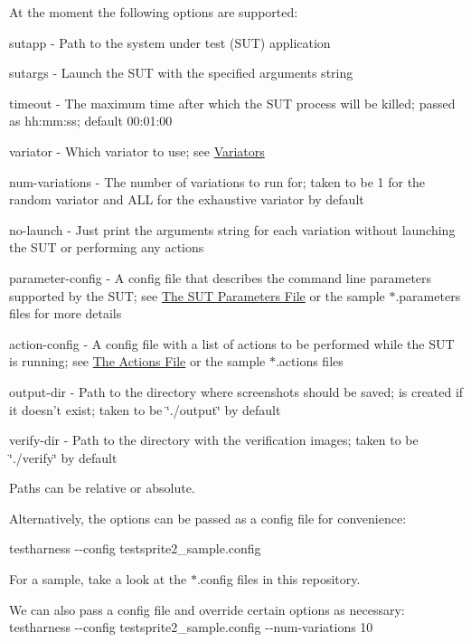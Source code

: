 At the moment the following options are supported\-: \begin{DoxyItemize}
\item {\ttfamily sutapp} -\/ Path to the system under test (S\-U\-T) application \item {\ttfamily sutargs} -\/ Launch the S\-U\-T with the specified arguments string \item {\ttfamily timeout} -\/ The maximum time after which the S\-U\-T process will be killed; passed as hh\-:mm\-:ss; default 00\-:01\-:00 \item {\ttfamily variator} -\/ Which variator to use; see \hyperlink{index_variators_sec}{Variators} \item {\ttfamily num-\/variations} -\/ The number of variations to run for; taken to be 1 for the random variator and A\-L\-L for the exhaustive variator by default \item {\ttfamily no-\/launch} -\/ Just print the arguments string for each variation without launching the S\-U\-T or performing any actions \item {\ttfamily parameter-\/config} -\/ A config file that describes the command line parameters supported by the S\-U\-T; see \hyperlink{index_paramconfig_sec}{The S\-U\-T Parameters File} or the sample $\ast$.parameters files for more details \item {\ttfamily action-\/config} -\/ A config file with a list of actions to be performed while the S\-U\-T is running; see \hyperlink{index_actionconfig_sec}{The Actions File} or the sample $\ast$.actions files \item {\ttfamily output-\/dir} -\/ Path to the directory where screenshots should be saved; is created if it doesn't exist; taken to be \char`\"{}./output\char`\"{} by default \item {\ttfamily verify-\/dir} -\/ Path to the directory with the verification images; taken to be \char`\"{}./verify\char`\"{} by default\end{DoxyItemize}
Paths can be relative or absolute.

Alternatively, the options can be passed as a config file for convenience\-:

{\ttfamily testharness -\/-\/config testsprite2\-\_\-sample.\-config}

For a sample, take a look at the $\ast$.config files in this repository.

We can also pass a config file and override certain options as necessary\-: {\ttfamily testharness -\/-\/config testsprite2\-\_\-sample.\-config -\/-\/num-\/variations 10}

